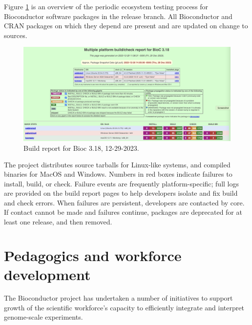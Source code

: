 \documentclass[]{article}
\begin{document}
Figure \ref{fig:qapic} is an overview of the periodic ecosystem
testing process for Bioconductor software packages in the
release branch. All Bioconductor
and CRAN packages on which they depend are present and are updated
on change to sources.

\begin{figure}
\includegraphics[width=1.21\linewidth,]{QApage} \caption{Build report for Bioc 3.18, 12-29-2023.}\label{fig:qapic}
\end{figure}

The project distributes source tarballs for Linux-like systems, and
compiled binaries for MacOS and Windows. Numbers in red boxes indicate
failures to install, build, or check. Failure events are
frequently platform-specific; full logs are provided
on the build report pages to help developers isolate and fix
build and check errors. When failures are persistent, developers
are contacted by core. If contact cannot be made and failures
continue, packages are deprecated for at least one release, and
then removed.

\hypertarget{pedagogics-and-workforce-development}{%
\section{Pedagogics and workforce development}\label{pedagogics-and-workforce-development}}

The Bioconductor project has undertaken a number
of initiatives to support growth of the
scientific workforce's capacity to efficiently
integrate and interpret
genome-scale experiments.
\end{document}
